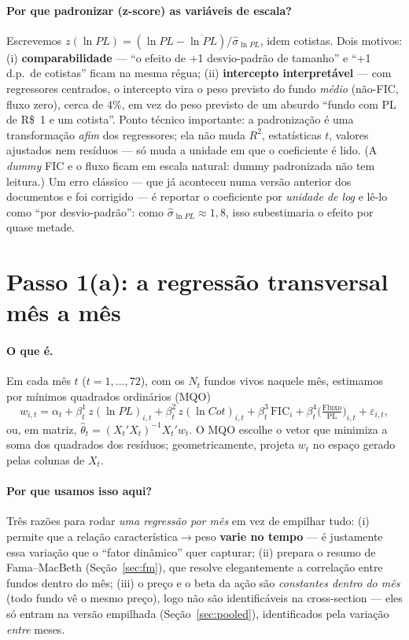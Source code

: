 \documentclass[11pt,a4paper]{article}
\newcommand{\porque}[0]{\paragraph{Por que usamos isso aqui?}}
\newcommand{\oquee}[0]{\paragraph{O que é.}}
\begin{document}
\paragraph{Por que padronizar (z-score) as variáveis de escala?} Escrevemos $z(\ln PL) =
(\ln PL - \overline{\ln PL})/\widehat\sigma_{\ln PL}$, idem cotistas. Dois motivos: (i)
\textbf{comparabilidade} --- ``o efeito de +1 desvio-padrão de tamanho'' e ``+1 d.p.\ de
cotistas'' ficam na mesma régua; (ii) \textbf{intercepto interpretável} --- com regressores
centrados, o intercepto vira o peso previsto do fundo \emph{médio} (não-FIC, fluxo zero), cerca
de $4\%$, em vez do peso previsto de um absurdo ``fundo com PL de R\$~1 e um cotista''. Ponto
técnico importante: a padronização é uma transformação \emph{afim} dos regressores; ela não muda
$R^2$, estatísticas $t$, valores ajustados nem resíduos --- só muda a unidade em que o coeficiente
é lido. (A \emph{dummy} FIC e o fluxo ficam em escala natural: dummy padronizada não tem leitura.)
Um erro clássico --- que já aconteceu numa versão anterior dos documentos e foi corrigido --- é
reportar o coeficiente por \emph{unidade de log} e lê-lo como ``por desvio-padrão'': como
$\widehat\sigma_{\ln PL}\approx1{,}8$, isso subestimaria o efeito por quase metade.

\section{Passo 1(a): a regressão transversal mês a mês}
\label{sec:cs}

\oquee Em cada mês $t$ ($t=1,\dots,72$), com os $N_t$ fundos vivos naquele mês, estimamos por
mínimos quadrados ordinários (MQO)
\begin{equation}
w_{i,t} = \alpha_t + \beta^1_t\, z(\ln PL)_{i,t} + \beta^2_t\, z(\ln Cot)_{i,t}
 + \beta^3_t\, \mathrm{FIC}_i + \beta^4_t \Big(\tfrac{\text{Fluxo}}{\text{PL}}\Big)_{i,t}
 + \varepsilon_{i,t},
\label{eq:cs}
\end{equation}
ou, em matriz, $\widehat\theta_t = (X_t'X_t)^{-1}X_t'w_t$. O MQO escolhe o vetor que minimiza a
soma dos quadrados dos resíduos; geometricamente, projeta $w_t$ no espaço gerado pelas colunas de
$X_t$.

\porque Três razões para rodar \emph{uma regressão por mês} em vez de empilhar tudo: (i) permite
que a relação característica$\to$peso \textbf{varie no tempo} --- é justamente essa variação que o
``fator dinâmico'' quer capturar; (ii) prepara o resumo de Fama--MacBeth
(Seção~\ref{sec:fm}), que resolve elegantemente a correlação entre fundos dentro do mês; (iii) o
preço e o beta da ação são \emph{constantes dentro do mês} (todo fundo vê o mesmo preço), logo não
são identificáveis na cross-section --- eles só entram na versão empilhada
(Seção~\ref{sec:pooled}), identificados pela variação \emph{entre} meses.
\end{document}
